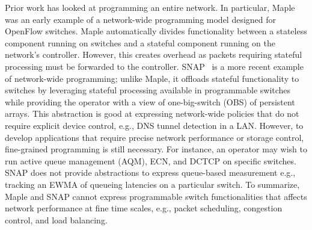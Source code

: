 Prior work has looked at programming an entire
network. In particular, Maple~\cite{maple} was an early example of a
network-wide programming model designed for OpenFlow switches. Maple
automatically divides functionality between a stateless component running on
switches and a stateful component running on the network's controller. However,
this creates overhead as packets requiring stateful processing
must be forwarded to the controller. SNAP~\cite{snap} is a more recent example of network-wide programming; unlike
Maple, it offloads stateful functionality to switches by
leveraging stateful processing available in programmable switches while providing the operator with a view of one-big-switch (OBS) of persistent arrays. 
This abstraction is good at expressing network-wide policies that do not require explicit device control, e.g., DNS tunnel detection in a LAN. 
However, to develop applications that require precise network performance or storage control, fine-grained programming is still necessary. For instance, an operator may wish to run active queue management (AQM), ECN, and DCTCP on specific switches. SNAP does not provide abstractions to express queue-based measurement e.g., tracking an EWMA of queueing latencies on a particular switch. %
To summarize, Maple and SNAP cannot express programmable switch functionalities that affects network performance at fine time scales, e.g., packet scheduling, congestion control, and load balancing. %

